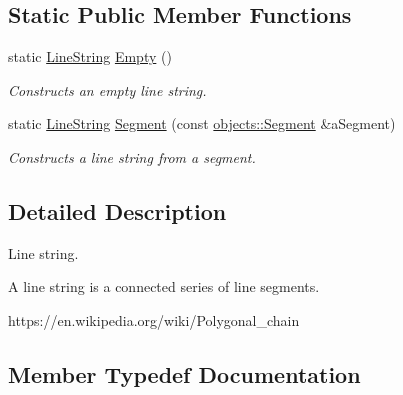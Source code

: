 \subsection*{Static Public Member Functions}
\begin{DoxyCompactItemize}
\item 
static \hyperlink{classostk_1_1math_1_1geom_1_1d2_1_1objects_1_1_line_string}{Line\+String} \hyperlink{classostk_1_1math_1_1geom_1_1d2_1_1objects_1_1_line_string_a3557befd15577368d8cc2f9c2a74dfec}{Empty} ()
\begin{DoxyCompactList}\small\item\em Constructs an empty line string. \end{DoxyCompactList}\item 
static \hyperlink{classostk_1_1math_1_1geom_1_1d2_1_1objects_1_1_line_string}{Line\+String} \hyperlink{classostk_1_1math_1_1geom_1_1d2_1_1objects_1_1_line_string_ab95e87bd77782e0a3d50bcd4866d0ec4}{Segment} (const \hyperlink{classostk_1_1math_1_1geom_1_1d2_1_1objects_1_1_segment}{objects\+::\+Segment} \&a\+Segment)
\begin{DoxyCompactList}\small\item\em Constructs a line string from a segment. \end{DoxyCompactList}\end{DoxyCompactItemize}


\subsection{Detailed Description}
Line string. 

A line string is a connected series of line segments.

https\+://en.wikipedia.\+org/wiki/\+Polygonal\+\_\+chain 

\subsection{Member Typedef Documentation}
\mbox{\label{classostk_1_1math_1_1geom_1_1d2_1_1objects_1_1_line_string_a29e6326c716bef2ec438534cfdc1e118}} 
